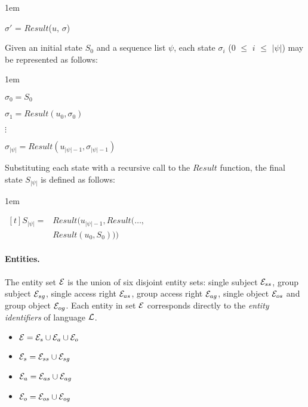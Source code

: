 \documentclass[11pt, twocolumn]{article}
\newenvironment{vquote}
  {\begin{list}{}{\leftmargin 1em}\item[]}
  {\end{list}}
\begin{document}
        \begin{vquote}
          $\sigma'$ = $Result$($u$, $\sigma$)
        \end{vquote}

        Given an initial state $S_{0}$ and a sequence list $\psi$, each state
        $\sigma_{i}$ ($0$ $\leq$ $i$ $\leq$ $|\psi|$) may be represented as
        follows:

        \begin{vquote}
          $\sigma_{0} = S_{0}$

          $\sigma_{1} = Result(u_{0}, \sigma_{0})$

          $\vdots$

          $\sigma_{|\psi|} = Result(u_{|\psi| - 1}, \sigma_{|\psi| - 1})$
        \end{vquote}

        Substituting each state with a recursive call to the $Result$ function,
        the final state $S_{|\psi|}$ is defined as follows:

        \begin{vquote}
          \begin{math}
            \begin{aligned}[t]
              S_{|\psi|} = & Result(u_{|\psi| - 1}, Result(\ldots, \\
              & Result(u_{0}, S_{0})))
            \end{aligned}
          \end{math}
        \end{vquote}

        \paragraph{Entities.}

          The entity set ${\cal E}$ is the union of six disjoint entity sets:
          single subject ${\cal E}_{ss}$, group subject ${\cal E}_{sg}$,
          single access right ${\cal E}_{as}$, group access right
          ${\cal E}_{ag}$, single object ${\cal E}_{os}$ and group object
          ${\cal E}_{og}$. Each entity in set ${\cal E}$ corresponds directly
          to the {\em entity identifiers} of language ${\cal L}$.

          \begin{itemize}
            \item
              ${\cal E} = {\cal E}_{s} \cup {\cal E}_{a} \cup {\cal E}_{o}$
            \item
              ${\cal E}_{s} = {\cal E}_{ss} \cup {\cal E}_{sg}$
            \item
              ${\cal E}_{a} = {\cal E}_{as} \cup {\cal E}_{ag}$
            \item
              ${\cal E}_{o} = {\cal E}_{os} \cup {\cal E}_{og}$
          \end{itemize}
\end{document}
